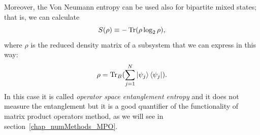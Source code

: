 Moreover, the Von Neumann entropy can be used also for bipartite mixed states; that is, we can calculate
\begin{equation*}
    S(\rho) \equiv -\operatorname{Tr} ( \rho \log_2\rho),
\end{equation*}
where $\rho$ is the reduced density matrix of a subsystem that we can express in this way:
\begin{equation*}
    \rho = \operatorname{Tr}_B (\sum_{j = 1}^{N}\ket{\psi_{j}}\bra{\psi_j}).
\end{equation*}
In this case it is called \emph{operator space entanglement entropy} and it does not measure the entanglement but it is a good quantifier of the functionality of matrix product operators method, as we will see in section~\ref{chap_numMethods_MPO}.


